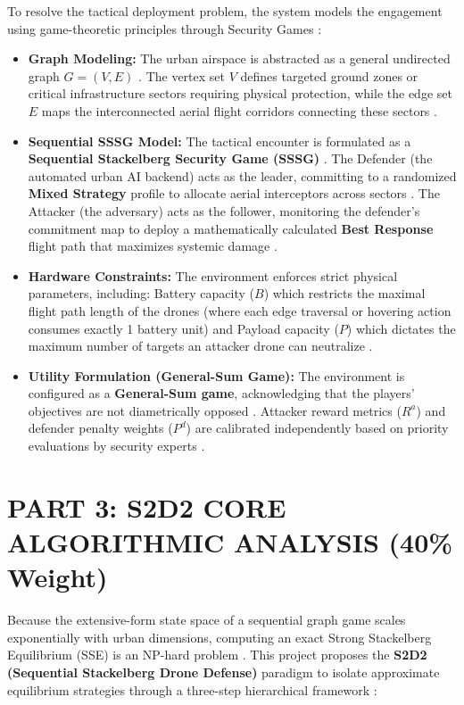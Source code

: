 \documentclass[11pt,a4paper]{article}
\begin{document}
To resolve the tactical deployment problem, the system models the engagement using game-theoretic principles through Security Games \cite{mutzari2025defending}:
\begin{itemize}
    \item \textbf{Graph Modeling:} The urban airspace is abstracted as a general undirected graph $G=(V,E)$ \cite{mutzari2025defending}. The vertex set $V$ defines targeted ground zones or critical infrastructure sectors requiring physical protection, while the edge set $E$ maps the interconnected aerial flight corridors connecting these sectors \cite{mutzari2025defending}.
    \item \textbf{Sequential SSSG Model:} The tactical encounter is formulated as a \textbf{Sequential Stackelberg Security Game (SSSG)} \cite{mutzari2025defending}. The Defender (the automated urban AI backend) acts as the leader, committing to a randomized \textbf{Mixed Strategy} profile to allocate aerial interceptors across sectors \cite{mutzari2025defending}. The Attacker (the adversary) acts as the follower, monitoring the defender's commitment map to deploy a mathematically calculated \textbf{Best Response} flight path that maximizes systemic damage \cite{mutzari2025defending}.
    \item \textbf{Hardware Constraints:} The environment enforces strict physical parameters, including: Battery capacity ($B$) which restricts the maximal flight path length of the drones (where each edge traversal or hovering action consumes exactly 1 battery unit) and Payload capacity ($P$) which dictates the maximum number of targets an attacker drone can neutralize \cite{mutzari2025defending}.
    \item \textbf{Utility Formulation (General-Sum Game):} The environment is configured as a \textbf{General-Sum game}, acknowledging that the players' objectives are not diametrically opposed \cite{mutzari2025defending}. Attacker reward metrics ($R^a$) and defender penalty weights ($P^d$) are calibrated independently based on priority evaluations by security experts \cite{mutzari2025defending}.
\end{itemize}

\section{PART 3: S2D2 CORE ALGORITHMIC ANALYSIS (40\% Weight)}

Because the extensive-form state space of a sequential graph game scales exponentially with urban dimensions, computing an exact Strong Stackelberg Equilibrium (SSE) is an NP-hard problem \cite{korzhyk2011security}. This project proposes the \textbf{S2D2 (Sequential Stackelberg Drone Defense)} paradigm to isolate approximate equilibrium strategies through a three-step hierarchical framework \cite{mutzari2025defending}:
\end{document}
